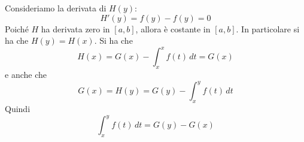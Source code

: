 Consideriamo la derivata di $H(y)$:
\begin{equation*}
H'(y) = f(y) - f(y) = 0
\end{equation*}
Poiché $H$ ha derivata zero in $[a,b]$, allora è costante in $[a,b]$. In particolare si ha che $H(y) = H(x)$. Si ha che
\begin{equation*}
H(x) = G(x) - \int_x^x f(t) \, dt = G(x)
\end{equation*}
e anche che
\begin{equation*}
G(x) = H(y) = G(y) - \int_x^y f(t) \, dt
\end{equation*}
Quindi
\begin{equation*}
\int_x^y f(t) \, dt = G(y) - G(x)
\end{equation*}